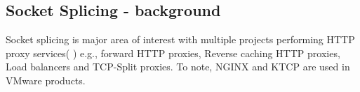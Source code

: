 
\subsection{Socket Splicing - background}
Socket splicing is major area of interest with multiple projects performing HTTP proxy services( \cite{squid,HAProxy,varnish,nginx,ktcp}) e.g., forward HTTP proxies, Reverse caching HTTP proxies, Load balancers\cite{cloudflare_sockmap} and TCP-Split proxies. To note, NGINX\cite{nginx} and KTCP\cite{ktcp} are used in VMware products.


